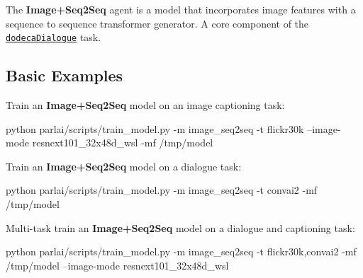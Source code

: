 The {\bfseries Image+\+Seq2\+Seq} agent is a model that incorporates image features with a sequence to sequence transformer generator. A core component of the \href{https://parl.ai/projects/dodecadialogue/}{\tt dodeca\+Dialogue} task.

\subsection*{Basic Examples}

Train an {\bfseries Image+\+Seq2\+Seq} model on an image captioning task\+: 
\begin{DoxyCode}
python parlai/scripts/train\_model.py -m image\_seq2seq -t flickr30k --image-mode resnext101\_32x48d\_wsl -mf
       /tmp/model
\end{DoxyCode}


Train an {\bfseries Image+\+Seq2\+Seq} model on a dialogue task\+: 
\begin{DoxyCode}
python parlai/scripts/train\_model.py -m image\_seq2seq -t convai2 -mf /tmp/model
\end{DoxyCode}


Multi-\/task train an {\bfseries Image+\+Seq2\+Seq} model on a dialogue and captioning task\+: 
\begin{DoxyCode}
python parlai/scripts/train\_model.py -m image\_seq2seq -t flickr30k,convai2 -mf /tmp/model --image-mode
       resnext101\_32x48d\_wsl
\end{DoxyCode}
 